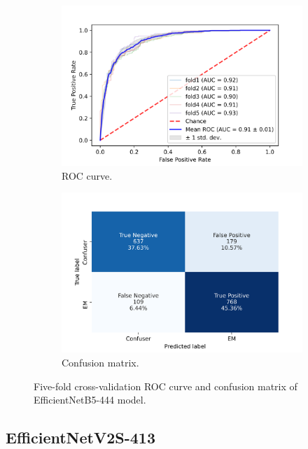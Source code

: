 \begin{figure}[h!]
	\centering
	\begin{subfigure}[b]{0.49\textwidth}
		\centering
		\includegraphics[width=\textwidth,keepaspectratio]{images/Supplement4/image195.png}
		\caption{ROC curve.}
	\end{subfigure}
	\hfill
	\begin{subfigure}[b]{0.49\textwidth}
		\centering
		\includegraphics[width=\textwidth,keepaspectratio]{images/Supplement4/image200.png}
		\caption{Confusion matrix.}
	\end{subfigure}
	\caption{Five-fold cross-validation ROC curve and confusion matrix of EfficientNetB5-444 model.}
\end{figure}

\vfill\clearpage
\subsection{EfficientNetV2S-413}

